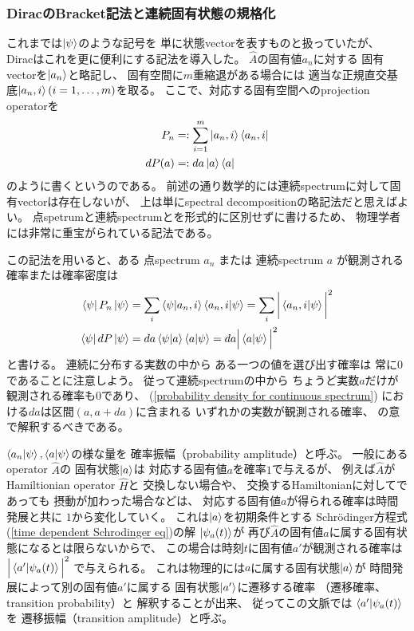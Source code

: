 \subsubsection{DiracのBracket記法と連続固有状態の規格化}

これまでは$\ket{\psi}$のような記号を
単に状態vectorを表すものと扱っていたが、
Diracはこれを更に便利にする記法を導入した。
$\hat{A}$の固有値$a_n$に対する
固有vectorを$\ket{a_n}$と略記し、
固有空間に$m$重縮退がある場合には
適当な正規直交基底$\ket{a_n,i}(i=1,\dots,m)$を取る。
ここで、対応する固有空間へのprojection operatorを
\begin{align}
    P_n &=: \sum_{i=1}^m \ket{a_n,i}\bra{a_n,i}
\\
    d P(a) &=: da \ket{a}\bra{a}
\label{projection operator for continuous spectrum}
\end{align}
のように書くというのである。
前述の通り数学的には連続spectrumに対して固有vectorは存在しないが、
上は単にspectral decompositionの略記法だと思えばよい。
点spetrumと連続spectrumとを形式的に区別せずに書けるため、
物理学者には非常に重宝がられている記法である。

この記法を用いると、ある
点spectrum $a_n$
または
連続spectrum $a$
が観測される確率または確率密度は
\begin{subequations}
\begin{align}
    \bra{ \psi }
        P_n
    \ket{ \psi }
    &=
    \sum_i
    \braket{ \psi | a_n, i }
    \braket{ a_n, i | \psi }
    =
    \sum_i
    \bigg|
        \braket{ a_n, i | \psi }
    \bigg|^2
\\
    \bra{ \psi }
        d P
    \ket{ \psi }
    &=
    d a
    \braket{ \psi | a }
    \braket{ a | \psi }
    =
    d a
    \Big|
        \braket{ a | \psi }
    \Big|^2
\label{probability density for continuous spectrum}
\end{align}
\end{subequations}
と書ける。
連続に分布する実数の中から
ある一つの値を選び出す確率は
常に$0$であることに注意しよう。
従って連続spectrumの中から
ちょうど実数$a$だけが観測される確率も$0$であり、
(\ref{probability density for continuous spectrum})
における$da$は区間$(a, a + da)$に含まれる
いずれかの実数が観測される確率、
の意で解釈するべきである。

$\braket{ a_n | \psi },
\braket{ a | \psi }$の様な量を
確率振幅（probability amplitude）と呼ぶ。
一般にあるoperator $\hat{A}$の
固有状態$\ket{a}$は
対応する固有値$a$を確率$1$で与えるが、
例えば$\hat{A}$が
Hamiltionian operator $\hat{H}$と
交換しない場合や、
交換するHamiltonianに対してであっても
摂動が加わった場合などは、
対応する固有値$a$が得られる確率は時間発展と共に
$1$から変化していく。
これは$\ket{a}$を初期条件とする
Schr\"odinger方程式
(\ref{time dependent Schrodinger eq})の解
$\ket{\psi_a(t)}$が
再び$\hat{A}$の固有値$a$に属する固有状態になるとは限らないからで、
この場合は時刻$t$に固有値$a'$が観測される確率は
$\Big| \braket{ a' | \psi_a(t) } \Big|^2$
で与えられる。
これは物理的には$a$に属する固有状態$\ket{a}$が
時間発展によって別の固有値$a'$に属する
固有状態$\ket{a'}$に遷移する確率
（遷移確率、transition probability）と
解釈することが出来、
従ってこの文脈では
$\braket{ a' | \psi_a(t) }$を
遷移振幅（transition amplitude）と呼ぶ。

